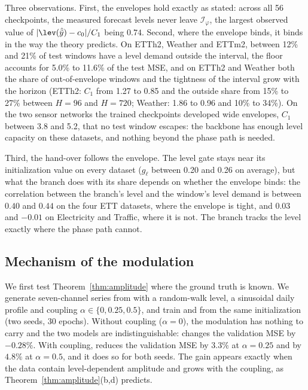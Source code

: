 {Three observations. First, the envelopes hold exactly as stated: across all 56 checkpoints, the measured forecast levels never leave $\mathcal I_\varphi$, the largest observed value of $|\lev(\hat{\tilde y})-c_0|/C_1$ being $0.74$. Second, where the envelope binds, it binds in the way the theory predicts. On ETTh2, Weather and ETTm2, between 12\% and 21\% of test windows have a level demand outside the interval, the floor accounts for 5.0\% to 11.6\% of the test MSE, and on ETTh2 and Weather both the share of out-of-envelope windows and the tightness of the interval grow with the horizon (ETTh2: $C_1$ from 1.27 to 0.85 and the outside share from 15\% to 27\% between $H=96$ and $H=720$; Weather: 1.86 to 0.96 and 10\% to 34\%). On the two sensor networks the trained checkpoints developed wide envelopes, $C_1$ between 3.8 and 5.2, that no test window escapes: the backbone has enough level capacity on these datasets, and nothing beyond the phase path is needed.

Third, the hand-over follows the envelope. The level gate stays near its initialization value on every dataset ($g_\ell$ between 0.20 and 0.26 on average), but what the branch does with its share depends on whether the envelope binds: the correlation between the branch's level and the window's level demand is between $0.40$ and $0.44$ on the four ETT datasets, where the envelope is tight, and $0.03$ and $-0.01$ on Electricity and Traffic, where it is not. The branch tracks the level exactly where the phase path cannot.

\subsection{Mechanism of the modulation}
\label{sec:exp_mechanism}

We first test Theorem~\ref{thm:amplitude} where the ground truth is known. We generate seven-channel series from  with a random-walk level, a sinusoidal daily profile and coupling $\alpha\in\{0,0.25,0.5\}$, and train \sysL and \sysLA from the same initialization (two seeds, 30 epochs). Without coupling ($\alpha=0$), the modulation has nothing to carry and the two models are indistinguishable: \sysLA changes the validation MSE by $-0.28\%$. With coupling, \sysLA reduces the validation MSE by $3.3\%$ at $\alpha=0.25$ and by $4.8\%$ at $\alpha=0.5$, and it does so for both seeds. The gain appears exactly when the data contain level-dependent amplitude and grows with the coupling, as Theorem~\ref{thm:amplitude}(b,d) predicts.

}
